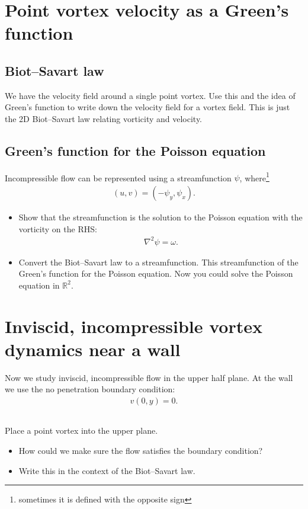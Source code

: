 \documentclass[11pt,letterpaper]{article}
\begin{document}
\section{Point vortex velocity as a Green's function}

\subsection{Biot–Savart law}
We have the velocity field around a single point vortex. Use this and the idea of Green's function to write down the velocity field for a vortex field. This is just the 2D Biot–Savart law relating vorticity and velocity.

\subsection{Green's function for the Poisson equation}
Incompressible flow can be represented using a streamfunction $\psi$, where\footnote{sometimes it is defined with the opposite sign}
\begin{align}
    (u,v) = (-\psi_y,\psi_x). 
\end{align}

\begin{itemize}
    \item Show that the streamfunction is the solution to the Poisson equation with the vorticity on the RHS:
        \begin{align}
            \nabla^2\psi = \omega.
        \end{align}
    \item Convert the Biot–Savart law to a streamfunction. This streamfunction of the Green's function for the Poisson equation. Now you could solve the Poisson equation in $\mathbb{R}^2$.
\end{itemize}

\section{Inviscid, incompressible vortex dynamics near a wall}
Now we study inviscid, incompressible flow in the upper half plane. At the wall we use the no penetration boundary condition:
\begin{align}
    v(0,y) = 0.
\end{align}

\subsection{}
Place a point vortex into the upper plane. 
\begin{itemize}
    \item How could we make sure the flow satisfies the boundary condition?
    \item Write this in the context of the Biot–Savart law.
\end{itemize}
\end{document}
